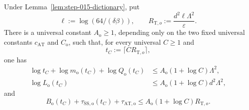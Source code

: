 \begin{lemma}\label{lem:step-015-envelope}
Under Lemma~\ref{lem:step-015-dictionary}, put
\[
\ell:=\log(64/(\delta\beta)),\qquad
R_{\mathrm T,o}:=\frac{d^2\ell\Lambda^2}{\varepsilon}.
\tag{3.1}
\]
There is a universal constant \(A_{\mathrm o}\ge1\), depending only on
the two fixed universal constants \(c_{\mathrm{AT}}\) and \(C_{\mathrm o}\),
such that, for every universal \(C\ge1\) and
\[
t_C:=\lceil C R_{\mathrm T,o}\rceil,
\tag{3.2}
\]
one has
\[
\begin{aligned}
\log t_C+\log m_{\mathrm o}(t_C)+\log Q_{\mathrm o}(t_C)
&\le A_{\mathrm o}(1+\log C)\Lambda^2,\\
\log L_{\mathrm o}(t_C)
&\le A_{\mathrm o}(1+\log C)d^2\Lambda^2,
\end{aligned}
\tag{3.3}
\]
and
\[
B_{\mathrm o}(t_C)+\tau_{\mathrm{SS,o}}(t_C)
+\tau_{\mathrm{AT,o}}
\le A_{\mathrm o}(1+\log C)R_{\mathrm T,o}.
\tag{3.4}
\]


\end{lemma}

